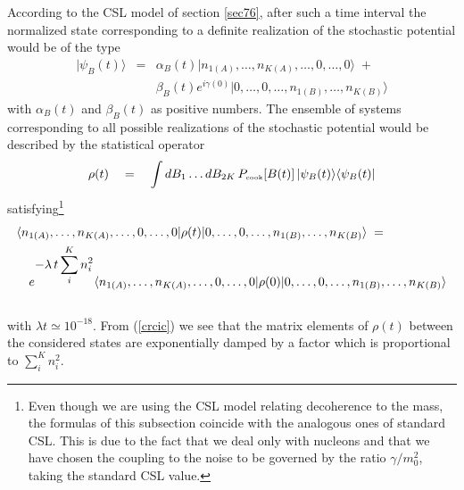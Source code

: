 \documentclass[10pt,a4paper]{article}
\begin{document}
According to the CSL model of section \ref{sec76}, after such a
time interval the normalized state corresponding to a definite
realization of the stochastic potential would be of the type
\begin{eqnarray} \label{fhs}
|\psi_{B}(t)\rangle & = & \alpha_{B}(t)|n_{1(A)}, \ldots,
n_{K(A)}, \ldots, 0, \ldots, 0\rangle \; + \nonumber \\
& & \beta_{B}(t) e^{i\gamma(0)} |0, \ldots, 0, \ldots, n_{1(B)},
\ldots, n_{K(B)} \rangle
\end{eqnarray}
with $\alpha_{B}(t)$ and $\beta_{B}(t)$ as positive numbers. The
ensemble of systems corresponding to all possible realizations of
the stochastic potential would be described by the statistical
operator
\begin{equation} \label{fhs2}
\rho(t) \quad = \quad \int dB_{1} \ldots dB_{2K}\,
P_{\makebox{\tiny cook}}[B(t)]\, |\psi_{B}(t)\rangle
\langle\psi_{B}(t)|
\end{equation}
satisfying\footnote{Even though we are using the CSL model
relating decoherence to the mass, the formulas of this subsection
coincide with the analogous ones of standard CSL. This is due to
the fact that we deal only with nucleons and that we have chosen
the coupling to the noise to be governed by the ratio
$\gamma/m_{0}^{2}$, taking the standard CSL value.}
\begin{eqnarray} \label{crcic}
\lefteqn{ \langle n_{1(A)}, \ldots, n_{K(A)}, \ldots, 0, \ldots,
0| \rho(t) |0, \ldots, 0, \ldots, n_{1(B)}, \ldots,
n_{K(B)}\rangle \; =}
\nonumber \\
& & e^{\displaystyle -\lambda\, t \sum_{i}^{K} n_{i}^{2}} \langle
n_{1(A)}, \ldots, n_{K(A)}, \ldots, 0, \ldots, 0| \rho(0) |0,
\ldots, 0, \ldots, n_{1(B)}, \ldots, n_{K(B)}\rangle \nonumber \\
& &
\end{eqnarray}
with $\lambda t \simeq 10^{-18}$. From (\ref{crcic}) we see that
the matrix elements of $\rho(t)$ between the considered states are
exponentially damped by a factor which is proportional to
$\sum_{i}^{K}n^{2}_{i}$.
\end{document}
